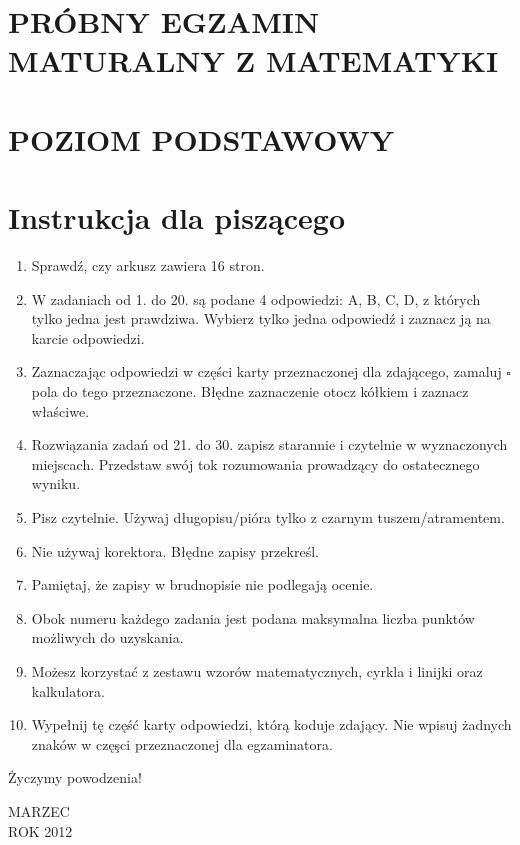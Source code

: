 \documentclass[10pt]{article}
\author{Czas pracy 170 minut}
\date{}
\begin{document}
\maketitle
\section*{PRÓBNY EGZAMIN MATURALNY Z MATEMATYKI}
\section*{POZIOM PODSTAWOWY}


\section*{Instrukcja dla piszącego}
\begin{enumerate}
  \item Sprawdź, czy arkusz zawiera 16 stron.
  \item W zadaniach od 1. do 20. są podane 4 odpowiedzi: A, B, C, D, z których tylko jedna jest prawdziwa. Wybierz tylko jedna odpowiedź i zaznacz ją na karcie odpowiedzi.
  \item Zaznaczając odpowiedzi w części karty przeznaczonej dla zdającego, zamaluj \(\square\) pola do tego przeznaczone. Błędne zaznaczenie otocz kółkiem i zaznacz właściwe.
  \item Rozwiązania zadań od 21. do 30. zapisz starannie i czytelnie w wyznaczonych miejscach. Przedstaw swój tok rozumowania prowadzący do ostatecznego wyniku.
  \item Pisz czytelnie. Używaj długopisu/pióra tylko z czarnym tuszem/atramentem.
  \item Nie używaj korektora. Błędne zapisy przekreśl.
  \item Pamiętaj, że zapisy w brudnopisie nie podlegają ocenie.
  \item Obok numeru każdego zadania jest podana maksymalna liczba punktów możliwych do uzyskania.
  \item Możesz korzystać z zestawu wzorów matematycznych, cyrkla i linijki oraz kalkulatora.
  \item Wypełnij tę część karty odpowiedzi, którą koduje zdający. Nie wpisuj żadnych znaków w częşci przeznaczonej dla egzaminatora.
\end{enumerate}

Życzymy powodzenia!

MARZEC\\
ROK 2012
\end{document}

